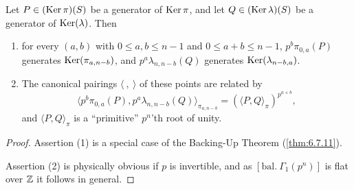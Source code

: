 \begin{kprop}\label{prop:7.9.2}
Let $P \in (\operatorname{Ker} \pi)(S)$ be a generator of $\operatorname{Ker} \pi$, and let $Q \in (\operatorname{Ker} \lambda)(S)$ be a generator of $\operatorname{Ker}(\lambda)$. Then
\begin{enumerate}[(1)]
\item for every $(a,b)$ with $0 \leq a, b \leq n-1$ and $0 \leq a+b \leq n-1$, $p^b \pi_{0,a}(P)$ generates $\operatorname{Ker}(\pi_{a,n-b})$, and $p^a \lambda_{n,n-b}(Q)$ generates $\operatorname{Ker}(\lambda_{n-b,a})$.
\item The canonical pairings $\langle\ ,\ \rangle$ of these points are related by
\[
\langle p^b \pi_{0,a}(P), p^a \lambda_{n,n-b}(Q) \rangle_{\pi_{a,n-b}} = (\langle P, Q \rangle_\pi)^{p^{a+b}} ,
\]
and $\langle P, Q \rangle_\pi$ is a ``primitive'' $p^n$'th root of unity.
\end{enumerate}
\end{kprop}

\begin{proof}
Assertion (1) is a special case of the Backing-Up Theorem (\ref{thm:6.7.11}).

Assertion (2) is physically obvious if $p$ is invertible, and as $[\mathrm{bal.}\ \Gamma_1(p^n)]$ is flat over $\mathbb{Z}$ it follows in general.
\end{proof}


